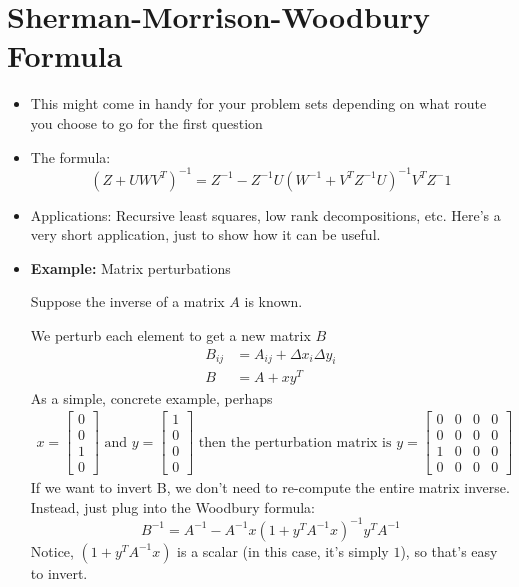 \documentclass[12pt]{article}
\begin{document}
\newpage

\section{Sherman-Morrison-Woodbury Formula}
\begin{itemize}
	\item This might come in handy for your problem sets depending on what route you choose to go for the first question
	\item The formula:
	$$ (Z + UWV^T)^{-1} = Z^{-1} - Z^{-1}U(W^{-1} + V^T Z^{-1} U)^{-1} V^T Z^-1 $$
	\item Applications: Recursive least squares, low rank decompositions, etc. Here's a very short application, just to show how it can be useful.
	\item \textbf{Example:} Matrix perturbations
		
	Suppose the inverse of a matrix $A$ is known.
	
	We perturb each element to get a new matrix $B$
	\begin{align*}
		B_{ij} &= A_{ij} + \Delta x_i \Delta y_i \\
		B &= A + xy^T
	\end{align*}
	As a simple, concrete example, perhaps
	\begin{align*}
	x = \left[ \begin{array}{c}
	0 \\ 0 \\ 1 \\ 0
	\end{array}\right]
	\text{\ \ and \ \ }
	y = \left[ \begin{array}{c}
	1 \\ 0 \\ 0 \\ 0
	\end{array}\right]
	\text{\ \ then the perturbation matrix is \ \ }
	y = \left[ \begin{array}{cccc}
	0 & 0 & 0 & 0 \\ 0 & 0 & 0 & 0 \\ 1 & 0 & 0 & 0 \\ 0 & 0 & 0 & 0
	\end{array}\right]
	\end{align*}
	If we want to invert B, we don't need to re-compute the entire matrix inverse. Instead, just plug into the Woodbury formula:
	$$B^{-1} = A^{-1} - A^{-1}x(1 + y^T A^{-1} x)^{-1} y^T A^{-1}$$
	Notice, $(1 + y^T A^{-1} x)$ is a scalar (in this case, it's simply $1$), so that's easy to invert.

\end{itemize}
\end{document}
